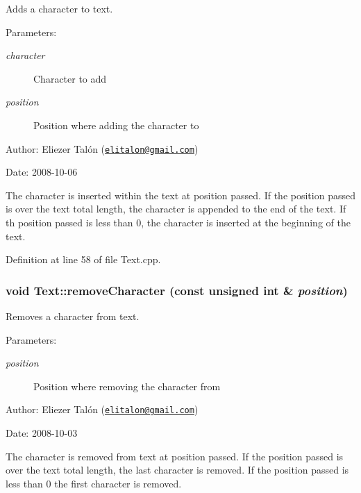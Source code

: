 Adds a character to text. 

\begin{Desc}
\item[Parameters:]
\begin{description}
\item[{\em character}]Character to add \item[{\em position}]Position where adding the character to\end{description}
\end{Desc}
\begin{Desc}
\item[Author:]Eliezer Talón (\href{mailto:elitalon@gmail.com}{\tt elitalon@gmail.com}) \end{Desc}
\begin{Desc}
\item[Date:]2008-10-06\end{Desc}
The character is inserted within the text at position passed. If the position passed is over the text total length, the character is appended to the end of the text. If th position passed is less than 0, the character is inserted at the beginning of the text. 

Definition at line 58 of file Text.cpp.\hypertarget{class_text_e04500eeada2a4a3bb00554b32263c52}{
\subsubsection[removeCharacter]{\setlength{\rightskip}{0pt plus 5cm}void Text::removeCharacter (const unsigned int \& {\em position})}}
\label{class_text_e04500eeada2a4a3bb00554b32263c52}


Removes a character from text. 

\begin{Desc}
\item[Parameters:]
\begin{description}
\item[{\em position}]Position where removing the character from\end{description}
\end{Desc}
\begin{Desc}
\item[Author:]Eliezer Talón (\href{mailto:elitalon@gmail.com}{\tt elitalon@gmail.com}) \end{Desc}
\begin{Desc}
\item[Date:]2008-10-03\end{Desc}
The character is removed from text at position passed. If the position passed is over the text total length, the last character is removed. If the position passed is less than 0 the first character is removed. 

